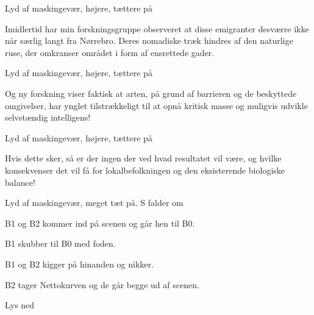 \documentclass[a4paper,11pt]{article}
\begin{document}
\begin{sketch}
\scene Lyd af maskingevær, højere, tættere på

 Imidlertid har min forskningsgruppe observeret at disse emigranter desværre ikke når særlig langt fra Nørrebro. Deres nomadiske træk hindres af den naturlige ruse, der omkranser området i form af ensrettede gader.

\scene Lyd af maskingevær, højere, tættere på

 Og ny forskning viser faktisk at arten, på grund af barrieren og de beskyttede omgivelser, har ynglet tilstrækkeligt til at opnå kritisk masse og muligvis udvikle selvstændig intelligens!

\scene Lyd af maskingevær, højere, tættere på

 Hvis dette sker, så er der ingen der ved hvad resultatet vil være, og hvilke konsekvenser det vil få for lokalbefolkningen og den eksisterende biologiske balance! 

\scene Lyd af maskingevær, meget tæt på. S falder om

\scene B1 og B2 kommer ind på scenen og går hen til B0.

\scene B1 skubber til B0 med foden.

\scene B1 og B2 kigger på hinanden og nikker.

\scene B2 tager Nettokurven og de går begge ud af scenen.

\scene Lys ned


\end{sketch}
\end{document}
